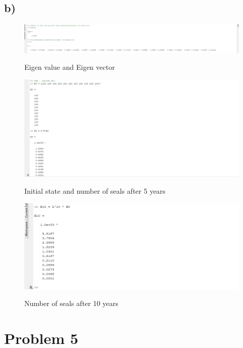 \documentclass[12pt,en,a4paper]{article}
\begin{document}
	\subsection*{b)}
	\begin{figure}[H]
		\centering
		\includegraphics[scale = .4]{prob4aEigenVal.png}
		\label{prob4aEV}
		\caption*{Eigen value and Eigen vector}
	\end{figure}
	\begin{figure}
		\centering
		\includegraphics[scale = .7]{prob4bX5.png}
		\label{prob4bX5}
		\caption*{Initial state and number of seals after 5 years}
	\end{figure}
	\begin{figure}
		\centering
		\includegraphics[scale = .7]{prob4bX10.png}
		\label{prob4bX10}
		\caption*{Number of seals after 10 years}
	\end{figure}
	\newpage
	\section*{Problem 5}
\end{document}
